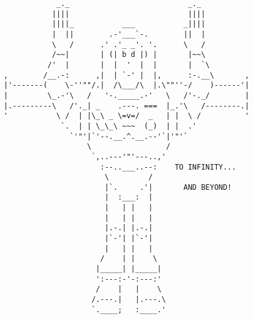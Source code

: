 \documentclass[12pt]{article}
\begin{document}
\vfill
\centering
\tiny %
\begin{BVerbatim}
            _._                           _._
           ||||                           ||||
           ||||_           ___           _||||
           |  ||        .-'___`-.        ||  |
           \   /      .' .'_ _'. '.      \   /
           /~~|       | (| b d |) |       |~~\
          /'  |       |  |  '  |  |       |  `\
,        /__.-:      ,|  | `-' |  |,      :-.__\       ,
|'-------(    \-''""/.|  /\___/\  |.\""''-/    )------'|
|         \_.-'\   /   '-._____.-'   \   /'-._/        |
|.---------\   /'._| _    .---. ===  |_.'\   /--------.|
'           \ /  | |\_\ _ \=v=/  _   | |  \ /          '
             `.  | | \_\_\ ~~~  (_)  | |  .'
               `'"'|`'--.__.^.__.--'`|'"'`
                   \                 /
                    `,..---'"'---..,'
                      :--..___..--:    TO INFINITY...
                       \         /  
                       |`.     .'|       AND BEYOND!
                       |  :___:  |
                       |   | |   |
                       |   | |   |
                       |.-.| |.-.|
                       |`-'| |`-'|
                       |   | |   |
                      /    | |    \
                     |_____| |_____|
                     ':---:-'-:---:'
                     /    |   |    \
                    /.---.|   |.---.\
                    `.____;   :____.'
\end{BVerbatim}
\end{document}
